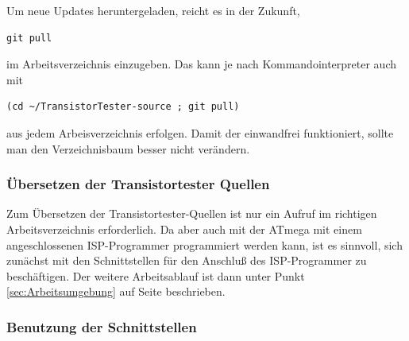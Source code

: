 Um neue Updates heruntergeladen, reicht es in der Zukunft, 
\begin{large} \vspace{-0.4em} \begin{verbatim}
git pull
\end{verbatim} \end{large}
im Arbeitsverzeichnis  einzugeben.
Das kann je nach Kommandointerpreter auch mit
\begin{large} \vspace{-0.4em} \begin{verbatim}
(cd ~/TransistorTester-source ; git pull)
\end{verbatim} \end{large}
aus jedem Arbeisverzeichnis erfolgen.
Damit der  einwandfrei funktioniert, sollte man den
Verzeichnisbaum besser nicht verändern.

\subsubsection{Übersetzen der Transistortester Quellen}

Zum Übersetzen der Transistortester-Quellen ist nur ein  Aufruf
im richtigen Arbeitsverzeichnis erforderlich.
Da aber auch mit  der ATmega mit einem angeschlossenen
ISP-Programmer programmiert werden kann, ist es sinnvoll,
sich zunächst mit den Schnittstellen für den Anschluß des ISP-Programmer
zu beschäftigen.
Der weitere Arbeitsablauf ist dann unter Punkt \ref{sec:Arbeitsumgebung} auf
Seite \pageref{sec:Arbeitsumgebung} beschrieben.

\subsubsection{Benutzung der Schnittstellen}
\label{sec:Schnittstellen}

